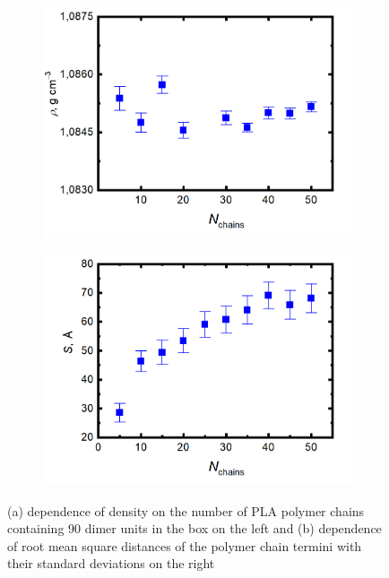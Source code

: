 \begin{figure}[htb!]
	\begin{subfigure}{0.5\textwidth}
		\centering
		\includegraphics[width=1\linewidth]{img/hustota_5_50_sigma.png}
		\caption{}
		\label{fig:box}
	\end{subfigure}
	\begin{subfigure}{0.5\textwidth}
		\centering
		\includegraphics[width=1\linewidth]{img/konce_5_50.png}
		\caption{}
		\label{fig:box_konce}
	\end{subfigure}   	
	\caption{(a) dependence of density on the number of PLA polymer chains containing 90 dimer units in the box on the left and (b) dependence of root mean square distances of the polymer chain termini with their standard deviations on the right}
	\vspace{-0.4cm}
\end{figure}


